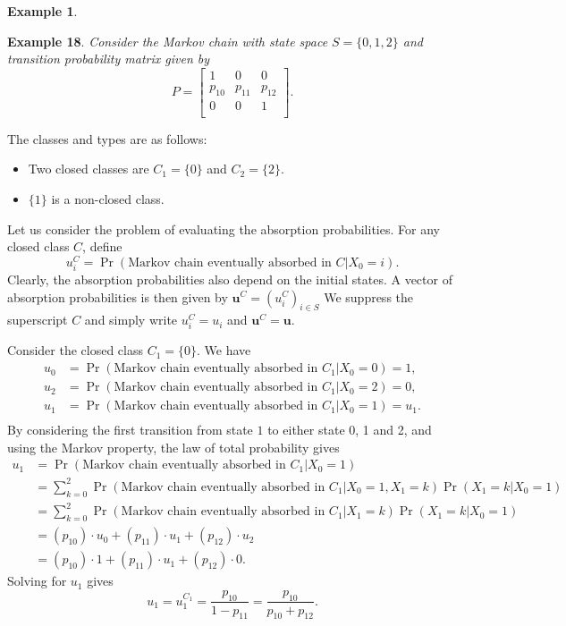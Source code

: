 \documentclass[
]{book}
\theoremstyle{definition}
\theoremstyle{definition}
\newtheorem{example}{Example}[chapter]
\theoremstyle{definition}
\theoremstyle{definition}
\theoremstyle{remark}
\begin{document}
\begin{example}
\protect\hypertarget{exm:eg_absorption}{}\label{exm:eg_absorption}

\textbf{Example 18}. \emph{Consider the Markov chain with state space
\(S = \{0,1,2\}\) and transition probability matrix given by
\[P = \begin{bmatrix}
    1 & 0 & 0    \\
    p_{10} & p_{11} & p_{12}   \\
   0 & 0 & 1   \\
\end{bmatrix}.\]}

\end{example}

The classes and types are as follows:

\begin{itemize}
\item
  Two closed classes are \(C_1 = \{0\}\) and \(C_2 = \{2\}\).
\item
  \(\{1\}\) is a non-closed class.
\end{itemize}

Let us consider the problem of evaluating the absorption probabilities.
For any closed class \(C\), define
\[u^C_{i} = \Pr(\text{Markov chain eventually absorbed in } C | X_0 = i).\]
Clearly, the absorption probabilities also depend on the initial states.
A vector of absorption probabilities is then given by
\(\mathbf{u}^C = (u^C_i)_{i \in S}\) We suppress the superscript \(C\) and
simply write \(u^C_{i} = u_i\) and \(\mathbf{u}^C = \mathbf{u}\).

Consider the closed class \(C_1 = \{0\}\). We have \[\begin{aligned}
    u_{0} &= \Pr(\text{Markov chain eventually absorbed in } C_1 | X_0 = 0) = 1, \\
    u_{2} &= \Pr(\text{Markov chain eventually absorbed in } C_1 | X_0 = 2) = 0, \\
    u_{1} &= \Pr(\text{Markov chain eventually absorbed in } C_1 | X_0 = 1) = u_1. \\   \end{aligned}\]
By considering the first transition from state \(1\) to either state 0, 1
and 2, and using the Markov property, the law of total probability gives
\[\begin{aligned}
    u_1 &= \Pr(\text{Markov chain eventually absorbed in } C_1 | X_0 = 1) \\
    &= \sum_{k = 0}^2 \Pr(\text{Markov chain eventually absorbed in } C_1 | X_0 = 1, X_1 = k)   \Pr(X_1 = k | X_0 = 1) \\
    &= \sum_{k = 0}^2 \Pr(\text{Markov chain eventually absorbed in } C_1 | X_1 = k)    \Pr(X_1 = k | X_0 = 1) \\
    &=  (p_{10}) \cdot  u_0 + (p_{11}) \cdot  u_1 + (p_{12}) \cdot  u_2  \\
    &= (p_{10})\cdot 1 + (p_{11}) \cdot  u_1 +  (p_{12}) \cdot 0. \end{aligned}\]
Solving for \(u_1\) gives
\[u_1 =  u^{C_1}_1 = \frac{p_{10}}{1 - p_{11}} = \frac{p_{10}}{p_{10} +  p_{12}}.\]
\end{document}
